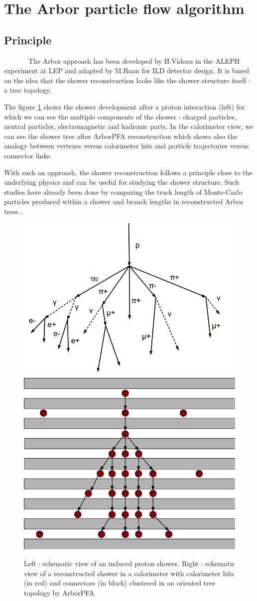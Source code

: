\documentclass[cits]{JINST}
\begin{document}
\section{The Arbor particle flow algorithm}

\subsection{Principle} 

~~~~~~~The Arbor approach has been developed by H.Videau in the ALEPH experiment at LEP and adapted by M.Ruan \cite{arbor-manqi} for ILD detector design. It is based on the idea that the shower reconstruction looks like the shower structure itself : a tree topology. 

The figure \ref{ARBOR_STRUCTURE} shows the shower development after a proton interaction (left) for which we can see the multiple components of the shower : charged particles, neutral particles, electromagnetic and hadronic parts. 
In the calorimeter view, we can see the shower tree after ArborPFA reconstruction which shows also the analogy between vertexes versus calorimeter hits and particle trajectories versus connector links

With such an approach, the shower reconstruction follows a principle close to the underlying physics and can be useful for studying the shower structure. Such studies have already been done by comparing the track length of Monte-Carlo particles produced within a shower and branch lengths in reconstructed Arbor trees \cite{arbor-manqi}.
  
\begin{figure}[!ht]
  \begin{center}
    \includegraphics[width=0.45\linewidth]{ProtonDecay.png} \hfill
    \includegraphics[width=0.45\linewidth]{ArborSchema.png}
  \end{center}
  \caption{\label{ARBOR_STRUCTURE} Left : schematic view of an induced proton shower. Right : schematic view of a reconstructed shower in a calorimeter with calorimeter hits (in red) and connectors (in black) clustered in an oriented tree topology by ArborPFA}
\end{figure}
\end{document}

